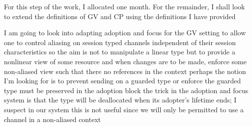 \documentclass{mprop}
\newcommand{\1}{\textbf{1}\xspace}
\begin{document}
 For this step of the work, I allocated one month. For the remainder, I shall look to extend the definitions of GV and CP using the definitions I have provided

I am going to look into adapting adoption and focus for the GV setting to allow one to control aliasing on session typed channels independent of their session characteristics so the aim is not to manipulate a linear type but to provide a nonlinear view of some resource and when changes are to be made, enforce some non-aliased view such that there no references in the context
perhaps the notion I'm looking for is to prevent sending on a guarded type or enforce the guarded type must be preserved in the adoption block
the trick in the adoption and focus system is that the type will be deallocated when its adopter's lifetime ends; I suspect in our system this is not useful since we will only be permitted to use a channel in a non-aliased context


\printbibliography
\end{document}
